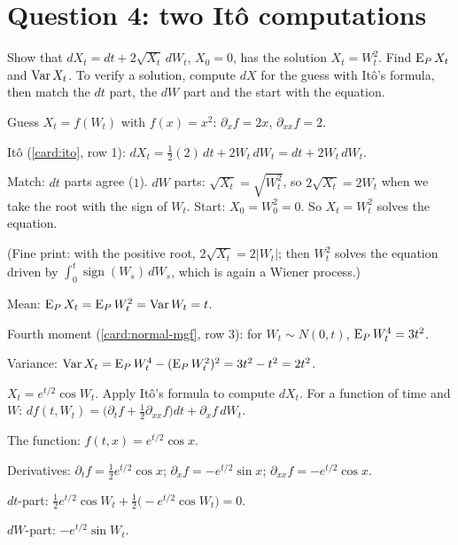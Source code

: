 \section{Question 4: two Itô computations}

\begin{problem}[Q4(a)]
Show that $dX_t=dt+2\sqrt{X_t}\,dW_t$, $X_0=0$, has the solution $X_t=W_t^2$. Find $\operatorname{E}_PX_t$ and $\operatorname{Var} X_t$.
\cardsays To verify a solution, compute $dX$ for the guess with Itô's formula, then match the $dt$ part, the $dW$ part and the start with the equation.
\working
\begin{steps}
\item Guess $X_t=f(W_t)$ with $f(x)=x^2$: $\partial_xf=2x$, $\partial_{xx}f=2$.
\item Itô (\cref{card:ito}, row 1): $dX_t=\frac12(2)\,dt+2W_t\,dW_t=dt+2W_t\,dW_t$.
\item Match: $dt$ parts agree ($1$). $dW$ parts: $\sqrt{X_t}=\sqrt{W_t^2}$, so $2\sqrt{X_t}=2W_t$ when we take the root with the sign of $W_t$. Start: $X_0=W_0^2=0$. So $X_t=W_t^2$ solves the equation.
\item (Fine print: with the positive root, $2\sqrt{X_t}=2|W_t|$; then $W_t^2$ solves the equation driven by $\int_0^t\operatorname{sign}(W_s)\,dW_s$, which is again a Wiener process.)
\item Mean: $\operatorname{E}_PX_t=\operatorname{E}_PW_t^2=\operatorname{Var} W_t=t$.
\item Fourth moment (\cref{card:normal-mgf}, row 3): for $W_t\sim N(0,t)$, $\operatorname{E}_PW_t^4=3t^2$.
\item Variance: $\operatorname{Var} X_t=\operatorname{E}_PW_t^4-(\operatorname{E}_PW_t^2)^2=3t^2-t^2=2t^2$.
\end{steps}
\end{problem}

\begin{problem}[Q4(b)(i)]
$X_t=e^{t/2}\cos W_t$. Apply Itô's formula to compute $dX_t$.
\cardsays For a function of time and $W$: $df(t,W_t)=\big(\partial_tf+\frac12\partial_{xx}f\big)dt+\partial_xf\,dW_t$.
\working
\begin{steps}
\item The function: $f(t,x)=e^{t/2}\cos x$.
\item Derivatives: $\partial_tf=\frac12e^{t/2}\cos x$; $\partial_xf=-e^{t/2}\sin x$; $\partial_{xx}f=-e^{t/2}\cos x$.
\item $dt$-part: $\frac12e^{t/2}\cos W_t+\frac12\big(-e^{t/2}\cos W_t\big)=0$.
\item $dW$-part: $-e^{t/2}\sin W_t$.
\end{steps}
\end{problem}

